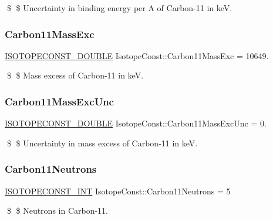 \$ \$ Uncertainty in binding energy per A of Carbon-\/11 in keV. \mbox{\label{group___isotope_const-_carbon-_c11_gad252af7a53df2baaab8016f0c3c76250}} 
\subsubsection{\texorpdfstring{Carbon11\+Mass\+Exc}{Carbon11MassExc}}
{\footnotesize\ttfamily \mbox{\hyperlink{group___isotope_const-_macros_ga8f45a7272ce02c0b4c65c44636ed719a}{I\+S\+O\+T\+O\+P\+E\+C\+O\+N\+S\+T\+\_\+\+D\+O\+U\+B\+LE}} Isotope\+Const\+::\+Carbon11\+Mass\+Exc = 10649.}

\$ \$ Mass excess of Carbon-\/11 in keV. \mbox{\label{group___isotope_const-_carbon-_c11_ga1f686d42bfa510eed0b855a6667385f7}} 
\subsubsection{\texorpdfstring{Carbon11\+Mass\+Exc\+Unc}{Carbon11MassExcUnc}}
{\footnotesize\ttfamily \mbox{\hyperlink{group___isotope_const-_macros_ga8f45a7272ce02c0b4c65c44636ed719a}{I\+S\+O\+T\+O\+P\+E\+C\+O\+N\+S\+T\+\_\+\+D\+O\+U\+B\+LE}} Isotope\+Const\+::\+Carbon11\+Mass\+Exc\+Unc = 0.}

\$ \$ Uncertainty in mass excess of Carbon-\/11 in keV. \mbox{\label{group___isotope_const-_carbon-_c11_gadfcd02cd456f613a7433e051953d0a2b}} 
\subsubsection{\texorpdfstring{Carbon11\+Neutrons}{Carbon11Neutrons}}
{\footnotesize\ttfamily \mbox{\hyperlink{group___isotope_const-_macros_ga5f18360b3e99483a35c32d789e62621c}{I\+S\+O\+T\+O\+P\+E\+C\+O\+N\+S\+T\+\_\+\+I\+NT}} Isotope\+Const\+::\+Carbon11\+Neutrons = 5}

\$ \$ Neutrons in Carbon-\/11. \mbox{\label{group___isotope_const-_carbon-_c11_ga33c5bce013abf707489b1d1df546cba5}} 
